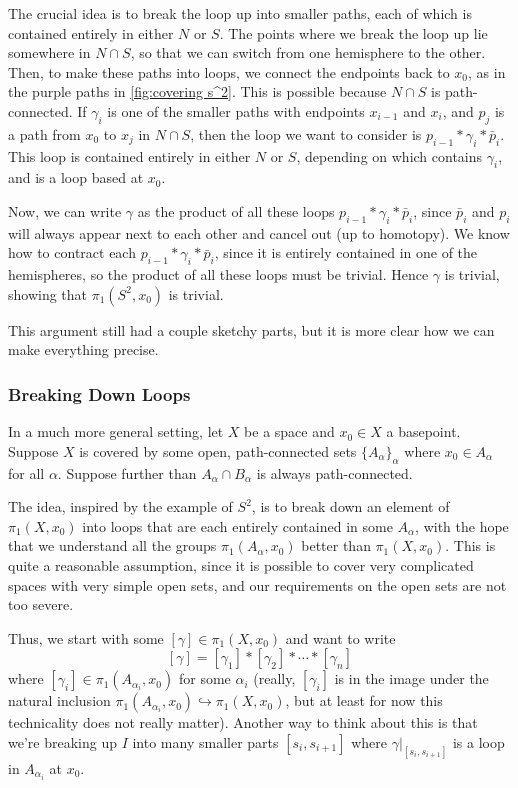 \documentclass{article}
\theoremstyle{definition}
\theoremstyle{remark}
\numberwithin{figure}{section}
\begin{document}
The crucial idea is to break the loop up into smaller paths, each of which is contained entirely in either $N$ or $S$. The points where we break the loop up lie somewhere in $N \cap S$, so that we can switch from one hemisphere to the other. Then, to make these paths into loops, we connect the endpoints back to $x_0$, as in the purple paths in \cref{fig:covering s^2}. This is possible because $N \cap S$ is path-connected. If $\gamma_i$ is one of the smaller paths with endpoints $x_{i - 1}$ and $x_i$, and $p_j$ is a path from $x_0$ to $x_j$ in $N \cap S$, then the loop we want to consider is $p_{i - 1} * \gamma_i * \bar p_i$. This loop is contained entirely in either $N$ or $S$, depending on which contains $\gamma_i$, and is a loop based at $x_0$.

Now, we can write $\gamma$ as the product of all these loops $p_{i - 1} * \gamma_i * \bar p_i$, since $\bar p_i$ and $p_i$ will always appear next to each other and cancel out (up to homotopy). We know how to contract each $p_{i - 1} * \gamma_i * \bar p_i$, since it is entirely contained in one of the hemispheres, so the product of all these loops must be trivial. Hence $\gamma$ is trivial, showing that $\pi_1(S^2, x_0)$ is trivial.

This argument still had a couple sketchy parts, but it is more clear how we can make everything precise.

\subsubsection{Breaking Down Loops}\label{subsec:breaking loops}
In a much more general setting, let $X$ be a space and $x_0 \in X$ a basepoint. Suppose $X$ is covered by some open, path-connected sets $\{A_\alpha\}_\alpha$ where $x_0 \in A_\alpha$ for all $\alpha$. Suppose further than $A_\alpha \cap B_\alpha$ is always path-connected.

The idea, inspired by the example of $S^2$, is to break down an element of $\pi_1(X, x_0)$ into loops that are each entirely contained in some $A_\alpha$, with the hope that we understand all the groups $\pi_1(A_\alpha, x_0)$ better than $\pi_1(X, x_0)$. This is quite a reasonable assumption, since it is possible to cover very complicated spaces with very simple open sets, and our requirements on the open sets are not too severe.

Thus, we start with some $[\gamma] \in \pi_1(X, x_0)$ and want to write
\[
[\gamma] = [\gamma_1] * [\gamma_2] * \cdots * [\gamma_n]
\]
where $[\gamma_i] \in \pi_1(A_{\alpha_i}, x_0)$ for some $\alpha_i$ (really, $[\gamma_i]$ is in the image under the natural inclusion $\pi_1(A_{\alpha_i}, x_0) \hookrightarrow \pi_1(X, x_0)$, but at least for now this technicality does not really matter). Another way to think about this is that we're breaking up $I$ into many smaller parts $[s_i, s_{i + 1}]$ where $\gamma|_{[s_i, s_{i + 1}]}$ is a loop in $A_{\alpha_i}$ at $x_0$.
\end{document}
